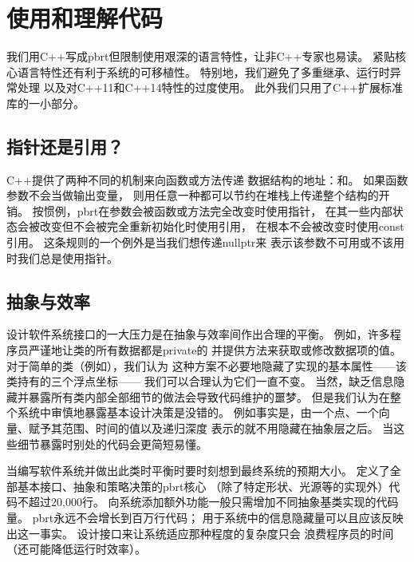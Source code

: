 \section{使用和理解代码}\label{sec:使用和理解代码}

我们用C++写成pbrt但限制使用艰深的语言特性，让非C++专家也易读。
紧贴核心语言特性还有利于系统的可移植性。
特别地，我们避免了多重继承、运行时异常处理
以及对C++11和C++14特性的过度使用。
此外我们只用了C++扩展标准库的一小部分。

\subsection{指针还是引用？}\label{sub:指针还是引用？}
C++提供了两种不同的机制来向函数或方法传递
数据结构的地址：和。
如果函数参数不会当做输出变量，
则用任意一种都可以节约在堆栈上传递整个结构的开销。
按惯例，pbrt在参数会被函数或方法完全改变时使用指针，
在其一些内部状态会被改变但不会被完全重新初始化时使用引用，
在根本不会被改变时使用{\ttfamily const}引用。
这条规则的一个例外是当我们想传递{\ttfamily nullptr}来
表示该参数不可用或不该用时我们总是使用指针。

\subsection{抽象与效率}\label{sub:抽象与效率}
设计软件系统接口的一大压力是在抽象与效率间作出合理的平衡。
例如，许多程序员严谨地让类的所有数据都是{\ttfamily private}的
并提供方法来获取或修改数据项的值。
对于简单的类（例如），我们认为
这种方案不必要地隐藏了实现的基本属性——该类持有的三个浮点坐标——
我们可以合理认为它们一直不变。
当然，缺乏信息隐藏并暴露所有类内部全部细节的做法会导致代码维护的噩梦。
但是我们认为在整个系统中审慎地暴露基本设计决策是没错的。
例如事实是，由一个点、一个向量、赋予其范围、时间的值以及递归深度
表示的就不用隐藏在抽象层之后。
当这些细节暴露时别处的代码会更简短易懂。

当编写软件系统并做出此类时平衡时要时刻想到最终系统的预期大小。
定义了全部基本接口、抽象和策略决策的pbrt核心
（除了特定形状、光源等的实现外）代码不超过20,000行。
向系统添加额外功能一般只需增加不同抽象基类实现的代码量。
pbrt永远不会增长到百万行代码；
用于系统中的信息隐藏量可以且应该反映出这一事实。
设计接口来让系统适应那种程度的复杂度只会
浪费程序员的时间（还可能降低运行时效率）。

